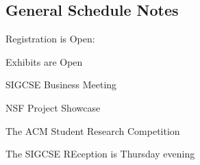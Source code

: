 \begin{center}
\section*{General Schedule Notes}
\end{center}

Registration is Open:

Exhibits are Open

SIGCSE Business Meeting

NSF Project Showcase

The ACM Student Research Competition

The SIGCSE REception is Thursday evening 

\newpage